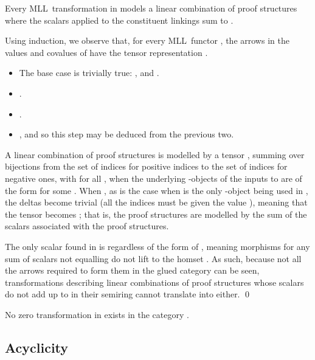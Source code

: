 \documentclass{LMCS}
\theoremstyle{plain}\newtheorem*{cLm}{Claim}
\newcommand{\mll}{MLL} \newcommand{\mall}{MALL}
\newcommand{\p}{} \newcommand{\N}{\mathbb{N}}
\begin{document}
\begin{prop} \label{OnlyOneLemma} Every \mll~transformation in 
  models a linear combination of proof structures where the scalars applied to the constituent linkings sum to .
\end{prop}
\proof
Using induction, we observe that, for every \mll~functor , the arrows in the values and covalues of  have the tensor representation . 
\begin{itemize}
\item The base case is trivially true: , and .
\item .
\item .
\item , and so this step may be deduced from the previous two.
\end{itemize}

A linear combination of proof structures is modelled by a tensor , summing over bijections  from the set of indices for positive indices to the set of indices for negative ones, with  for all , when the underlying -objects of the inputs to  are of the form  for some . When , as is the case when  is the only -object being used in , the deltas become trivial (all the indices must be given the value ), meaning that the tensor becomes ; that is, the proof structures are modelled by the sum of the scalars associated with the proof structures.

 \p The only scalar found in  is  regardless of the form of , meaning morphisms for any sum of scalars not equalling  do not lift to the homset . As such, because not all the arrows required to form them in the glued category can be seen, transformations describing linear combinations of proof structures whose scalars do not add up to  in their semiring cannot translate into  either. \qed

\begin{cor}
No zero transformation  in  exists in the category .
\end{cor}

\subsection{Acyclicity} \label{SubsectionAcyclic}
\end{document}
